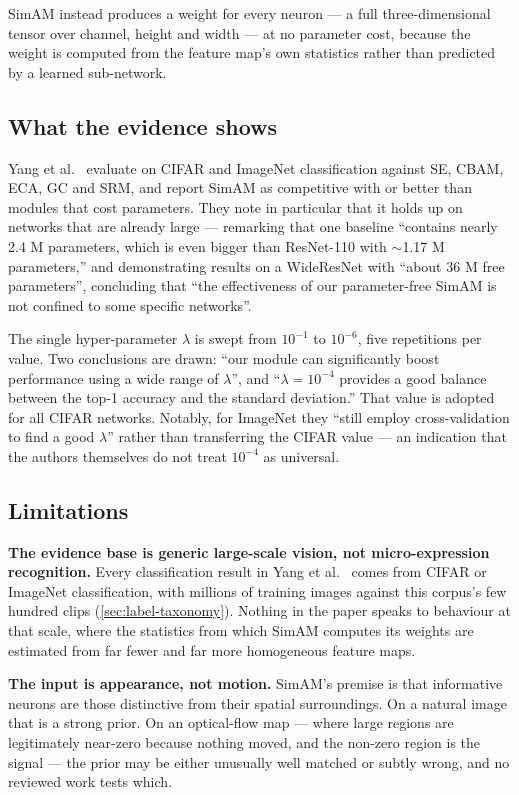 SimAM instead produces a weight for every neuron --- a full three-dimensional tensor over channel, height and width --- at no parameter cost, because the weight is computed from the feature map's own statistics rather than predicted by a learned sub-network.

\subsection{What the evidence shows}
\label{sec:simam-evidence}

Yang et al.~\cite{yang2021} evaluate on CIFAR and ImageNet classification against SE, CBAM, ECA, GC and SRM, and report SimAM as competitive with or better than modules that cost parameters. They note in particular that it holds up on networks that are already large --- remarking that one baseline ``contains nearly 2.4 M parameters, which is even bigger than ResNet-110 with $\sim$1.17 M parameters,'' and demonstrating results on a WideResNet with ``about 36 M free parameters'', concluding that ``the effectiveness of our parameter-free SimAM is not confined to some specific networks''.

The single hyper-parameter $\lambda$ is swept from $10^{-1}$ to $10^{-6}$, five repetitions per value. Two conclusions are drawn: ``our module can significantly boost performance using a wide range of $\lambda$'', and ``$\lambda = 10^{-4}$ provides a good balance between the top-1 accuracy and the standard deviation.'' That value is adopted for all CIFAR networks. Notably, for ImageNet they ``still employ cross-validation to find a good $\lambda$'' rather than transferring the CIFAR value --- an indication that the authors themselves do not treat $10^{-4}$ as universal.

\subsection{Limitations}
\label{sec:simam-limitations}

\textbf{The evidence base is generic large-scale vision, not micro-expression recognition.} Every classification result in Yang et al.~\cite{yang2021} comes from CIFAR or ImageNet classification, with millions of training images against this corpus's few hundred clips (\autoref{sec:label-taxonomy}). Nothing in the paper speaks to behaviour at that scale, where the statistics from which SimAM computes its weights are estimated from far fewer and far more homogeneous feature maps.

\textbf{The input is appearance, not motion.} SimAM's premise is that informative neurons are those distinctive from their spatial surroundings. On a natural image that is a strong prior. On an optical-flow map --- where large regions are legitimately near-zero because nothing moved, and the non-zero region is the signal --- the prior may be either unusually well matched or subtly wrong, and no reviewed work tests which.

